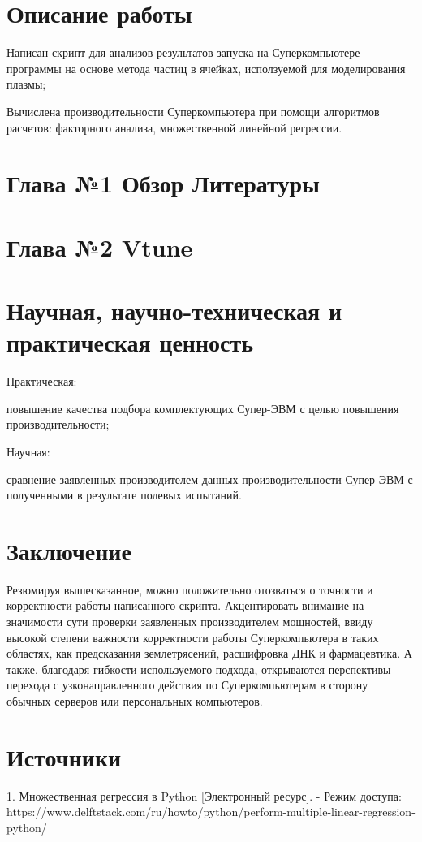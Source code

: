 \documentclass{article}
\begin{document}
\section{Описание работы}
Написан скрипт для анализов результатов запуска на Суперкомпьютере программы на основе метода частиц в ячейках, исползуемой для моделирования плазмы;

Вычислена производительности Суперкомпьютера при помощи алгоритмов расчетов: факторного анализа, множественной линейной регрессии.

\section{Глава №1 Обзор Литературы}

\section{Глава №2 Vtune}

\section{Научная, научно-техническая и практическая ценность}
Практическая:

повышение качества подбора комплектующих Супер-ЭВМ с целью повышения производительности;

Научная:

сравнение заявленных производителем данных производительности Супер-ЭВМ с полученными в результате полевых испытаний.

\section{Заключение}
Резюмируя вышесказанное, можно положительно отозваться о точности и корректности работы написанного скрипта. Акцентировать внимание на значимости сути проверки заявленных производителем мощностей, ввиду высокой степени важности корректности работы Суперкомпьютера в таких областях, как предсказания землетрясений, расшифровка ДНК и фармацевтика. А также, благодаря гибкости используемого подхода, открываются перспективы перехода с узконаправленного действия по Суперкомпьютерам в сторону обычных серверов или персональных компьютеров.




\section{Источники}
1. Множественная регрессия в Python [Электронный ресурс].
   - Режим доступа: https://www.delftstack.com/ru/howto/python/perform-multiple-linear-regression-python/
\end{document}
